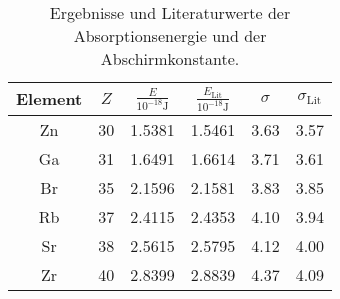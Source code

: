 \begin{table}
    \centering
    \caption{Ergebnisse und Literaturwerte der Absorptionsenergie und der Abschirmkonstante.\cite{xray}}
    \begin{tabular}{c S[table-format=1.0] S S S S}
        \toprule
        Element & $Z$ & $\frac{E}{10^{-18}\si{\J}}$ & $\frac{E_\text{Lit}}{10^{-18}\si{\J}}$ & $\sigma$ & $\sigma_\text{Lit}$ \\
        \midrule
        Zn & 30 & 1.5381 & 1.5461 & 3.63 & 3.57 \\
        Ga & 31 & 1.6491 & 1.6614 & 3.71 & 3.61 \\
        Br & 35 & 2.1596 & 2.1581 & 3.83 & 3.85 \\
        Rb & 37 & 2.4115 & 2.4353 & 4.10 & 3.94 \\
        Sr & 38 & 2.5615 & 2.5795 & 4.12 & 4.00 \\
        Zr & 40 & 2.8399 & 2.8839 & 4.37 & 4.09 \\
        \bottomrule
    \end{tabular}
    \label{tab:absorption}
\end{table}

